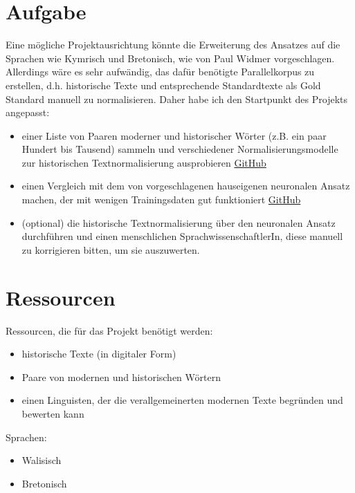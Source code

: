 \documentclass{scrartcl}
\begin{document}
\section{Aufgabe}
Eine mögliche Projektausrichtung könnte die Erweiterung des Ansatzes auf die Sprachen wie Kymrisch und Bretonisch, wie von Paul Widmer vorgeschlagen. Allerdings wäre es sehr aufwändig, das dafür benötigte Parallelkorpus zu erstellen, d.h. historische Texte und entsprechende Standardtexte als Gold Standard manuell zu normalisieren. Daher habe ich den Startpunkt des Projekts angepasst:
\begin{itemize}
\item einer Liste von Paaren moderner und historischer Wörter (z.B. ein paar Hundert bis Tausend) sammeln und verschiedener Normalisierungsmodelle zur historischen Textnormalisierung ausprobieren \href{https://github.com/coastalcph/histnorm#tldr-the-recommended-normalization-approach}{GitHub}
\item einen Vergleich mit dem von \cite{makarov-clematide-2020-semi} vorgeschlagenen hauseigenen neuronalen Ansatz machen, der mit wenigen Trainingsdaten gut funktioniert \href{https://github.com/peter-makarov/il-reimplementation/tree/feature/sgm2021}{GitHub}
\item (optional) die historische Textnormalisierung über den neuronalen Ansatz durchführen und einen menschlichen SprachwissenschaftlerIn, diese manuell zu korrigieren bitten, um sie auszuwerten.
\end{itemize}

\section{Ressourcen}
Ressourcen, die für das Projekt benötigt werden:
\begin{itemize}
\item historische Texte (in digitaler Form)
\item Paare von modernen und historischen Wörtern
\item einen Linguisten, der die verallgemeinerten modernen Texte begründen und bewerten kann
\end{itemize}

Sprachen:
\begin{itemize}
\item Walisisch 
\item Bretonisch
\end{itemize}
\end{document}

